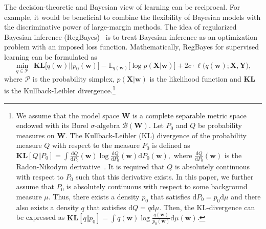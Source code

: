 \documentclass[twoside,11pt]{article}
\newcommand{\Xv}{\bm{X}}
\newcommand{\Yv}{\bm{Y}}
\newcommand{\wv}{\bm{w}}
\newcommand{\Wv}{\bm{W}}
\newcommand{\loss}{\ell}
\newcommand{\ud}{\mathrm{d}}
\newcommand{\ep}{\mathbb{E}}
\newcommand{\KL}{\textbf{KL}}
\begin{document}
The decision-theoretic and Bayesian view of learning can be reciprocal. For example, it would be beneficial to combine the flexibility of Bayesian models with the discriminative power of large-margin methods. The idea of regularized Bayesian inference (RegBayes)~\citep{zhu2013bayesian} is to treat Bayesian inference as an optimization problem with an imposed loss function. Mathematically, RegBayes for supervised learning can be formulated as
\begin{equation}\label{eq:regBayes}
\min\limits_{q \in \mathcal{P}}~~ \KL\Big[q(\wv)||p_0(\wv)\Big] - \ep_{q(\wv)} \Big[ \log p(\Xv | \wv) \Big] + 2c \cdot \loss\Big(q(\wv); \Xv, \Yv \Big),
\end{equation}
where $\mathcal{P}$ is the probability simplex, $p(\Xv | \wv)$ is the likelihood function and $\KL$ is the Kullback-Leibler divergence.\footnote{We assume that the model space $\Wv$ is a complete separable metric space endowed with its Borel $\sigma$-algebra $\mathcal{B}(\Wv)$. Let $P_0$ and $Q$ be probability measures on $\Wv$. The Kullback-Leibler (KL) divergence of the probability measure $Q$ with respect to the measure $P_0$ is defined as $\KL[ Q \Vert P_0] = \int \frac{\ud Q}{\ud P_0}(\wv) \log \frac{\ud Q}{\ud P_0}(\wv) \ud P_0(\wv),$ where $\frac{\ud Q}{\ud P_0}(\wv)$ is the Radon-Nikodym derivative~\citep{durret2010}. It is required that $Q$ is absolutely continuous with respect to $P_0$ such that this derivative exists. In this paper, we further assume that $P_0$ is absolutely continuous with respect to some background measure $\mu$. Thus, there exists a density $p_0$ that satisfies $\ud P_0 = p_0 \ud \mu$ and there also exists a density $q$ that satisfies $\ud Q = q \ud \mu$. Then, the KL-divergence can be expressed as $\KL[ q \Vert p_0 ] = \int q(\wv) \log \frac{q(\wv)}{p_0(\wv)} \ud \mu(\wv)$.}
\end{document}
